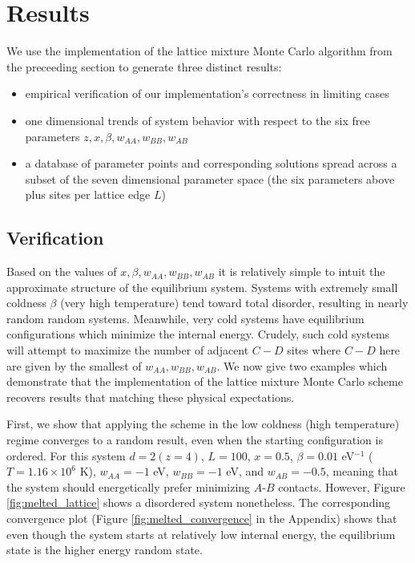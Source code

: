 \documentclass[10pt]{article}
\begin{document}
\section{Results}

We use the implementation of the lattice mixture Monte Carlo algorithm from the preceeding section to generate three distinct results:
\begin{itemize}
    \item empirical verification of our implementation's correctness in limiting cases
    \item one dimensional trends of system behavior with respect to the six free parameters $z,x,\beta,w_{AA},w_{BB},w_{AB}$
    \item a database of parameter points and corresponding solutions spread across a subset of the seven dimensional parameter space (the six parameters above plus sites per lattice edge $L$)
\end{itemize}

\subsection{Verification}
Based on the values of $x,\beta,w_{AA},w_{BB},w_{AB}$ it is relatively simple to intuit the approximate structure of the equilibrium system.
Systems with extremely small coldness $\beta$ (very high temperature) tend toward total disorder, resulting in nearly random random systems.
Meanwhile, very cold systems have equilibrium configurations which minimize the internal energy.
Crudely, such cold systems will attempt to maximize the number of adjacent $C-D$ sites where $C-D$ here are given by the smallest of $w_{AA},w_{BB},w_{AB}$.
We now give two examples which demonstrate that the implementation of the lattice mixture Monte Carlo scheme recovers results that matching these physical expectations.

First, we show that applying the scheme in the low coldness (high temperature) regime converges to a random result, even when the starting configuration is ordered.
For this system $d=2 (z=4)$, $L=100$, $x=0.5$, $\beta = 0.01$ eV$^{-1}$ ($T=1.16 \times 10^6$ K), $w_{AA}=-1$ eV, $w_{BB} = -1$ eV, and $w_{AB} = -0.5$, meaning that the system should energetically prefer minimizing $A$-$B$ contacts.
However, Figure \ref{fig:melted_lattice} shows a disordered system nonetheless.
The corresponding convergence plot (Figure \ref{fig:melted_convergence} in the Appendix) shows that even though the system starts at relatively low internal energy, the equilibrium state is the higher energy random state.
\end{document}
